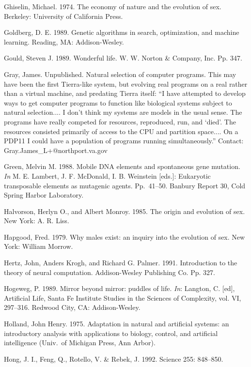 \begin{thebibliography}{99}
Ghiselin, Michael.  1974.  The economy of nature and the evolution
of sex.  Berkeley: University of California Press.

Goldberg, D. E.  1989.  Genetic algorithms in search, optimization,
and machine learning.  Reading, MA: Addison-Wesley.

Gould, Steven J.  1989.  Wonderful life.  W. W. Norton \& Company, Inc.
Pp. 347.

Gray, James.  Unpublished.  Natural selection of computer programs.
This may have been the first Tierra-like system, but evolving real
programs on a real rather than a virtual machine, and predating Tierra
itself: ``I have attempted to develop ways to get computer programs to
function like biological systems subject to natural selection....  I don't
think my systems are models in the usual sense.  The programs have
really competed for resources, reproduced, run, and `died'.  The
resources consisted primarily of access to the CPU and partition
space....  On a PDP11 I could have a population of programs running
simultaneously.'' Contact: Gray.James\_L+@northport.va.gov

Green, Melvin M.  1988.  Mobile DNA elements and spontaneous gene mutation.
{\it In} M. E. Lambert, J. F. McDonald, I. B. Weinstein [eds.]:
Eukaryotic transposable elements as mutagenic agents.  Pp.\ 41--50.
Banbury Report 30, Cold Spring Harbor Laboratory.

Halvorson, Herlyn O., and Albert Monroy.  1985.  The origin and evolution
of sex.  New York: A. R. Liss.

Hapgood, Fred.  1979.  Why males exist: an inquiry into the evolution
of sex.  New York: William Morrow.

Hertz, John, Anders Krogh, and Richard G. Palmer.  1991.  Introduction
to the theory of neural computation.  Addison-Wesley Publishing Co.
Pp. 327.

Hogeweg, P.  1989.  Mirror beyond mirror: puddles of life.
{\em In\/}: Langton, C. [ed], Artificial Life, Santa Fe Institute
Studies in the Sciences of Complexity, vol. VI, 297--316.
Redwood City, CA: Addison-Wesley.

Holland, John Henry.  1975.  Adaptation in natural and artificial systems:
an introductory analysis with applications to biology, control, and
artificial intelligence (Univ.\ of Michigan Press, Ann Arbor).

Hong, J. I., Feng, Q., Rotello, V. \& Rebek, J.  1992.
Science 255: 848--850.


\end{thebibliography}

